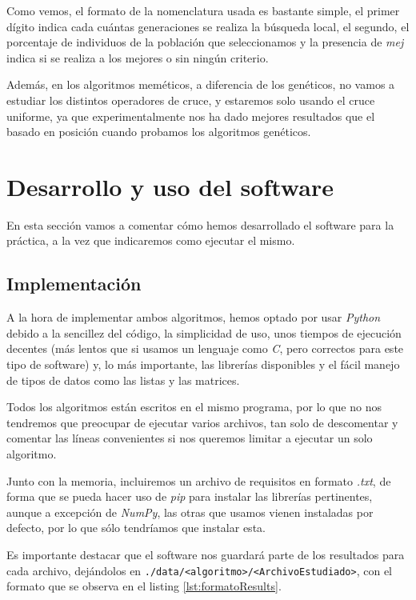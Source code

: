 Como vemos, el formato de la nomenclatura usada es bastante simple, el primer dígito indica cada cuántas generaciones se realiza la búsqueda local, el segundo, el porcentaje de individuos de la población que seleccionamos y la presencia de \textit{mej} indica si se realiza a los mejores o sin ningún criterio.

Además, en los algoritmos meméticos, a diferencia de los genéticos, no vamos a estudiar los distintos operadores de cruce, y estaremos solo usando el cruce uniforme, ya que experimentalmente nos ha dado mejores resultados que el basado en posición cuando probamos los algoritmos genéticos.

\newpage

\section{Desarrollo y uso del software}

En esta sección vamos a comentar cómo hemos desarrollado el software para la práctica, a la vez que indicaremos como ejecutar el mismo.


\subsection{Implementación}

A la hora de implementar ambos algoritmos, hemos optado por usar \textit{Python} debido a la sencillez del código, la simplicidad de uso, unos tiempos de ejecución decentes (más lentos que si usamos un lenguaje como \textit{C}, pero correctos para este tipo de software) y, lo más importante, las librerías disponibles y el fácil manejo de tipos de datos como las listas y las matrices.

Todos los algoritmos están escritos en el mismo programa, por lo que no nos tendremos que preocupar de ejecutar varios archivos, tan solo de descomentar y comentar las líneas convenientes si nos queremos limitar a ejecutar un solo algoritmo.

Junto con la memoria, incluiremos un archivo de requisitos en formato \textit{.txt}, de forma que se pueda hacer uso de \textit{pip} para instalar las librerías pertinentes, aunque a excepción de \textit{NumPy}, las otras que usamos vienen instaladas por defecto, por lo que sólo tendríamos que instalar esta.

Es importante destacar que el software nos guardará parte de los resultados para cada archivo, dejándolos en \texttt{./data/<algoritmo>/<ArchivoEstudiado>}, con el formato que se observa en el listing \ref{lst:formatoResults}.

